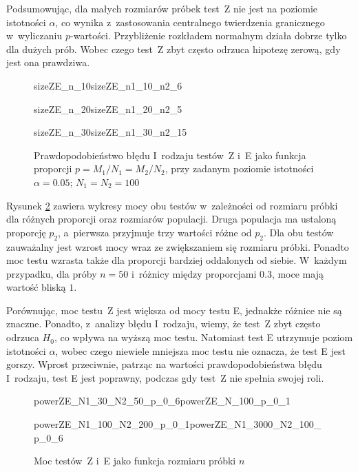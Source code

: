 Podsumowując, dla małych rozmiarów próbek test~Z nie jest na poziomie istotności $\alpha$, co wynika z~zastosowania centralnego twierdzenia granicznego w~wyliczaniu $p$-wartości. Przybliżenie rozkładem normalnym działa dobrze tylko dla dużych prób. Wobec czego test~Z zbyt często odrzuca hipotezę zerową, gdy jest ona prawdziwa. 

\begin{figure}[!h]
	\begin{subdiagrams}{sizeZE_n_10}{sizeZE_n1_10_n2_6}
	\end{subdiagrams}
	
	\begin{subdiagrams}{sizeZE_n_20}{sizeZE_n1_20_n2_5}
	\end{subdiagrams}
	
	\begin{subdiagrams}{sizeZE_n_30}{sizeZE_n1_30_n2_15}
	\end{subdiagrams}
	\caption{Prawdopodobieństwo błędu I~rodzaju testów~Z i~E jako funkcja proporcji $p=M_1/N_1=M_2/N_2$, przy zadanym poziomie istotności $\alpha=0.05$; $N_1=N_2=100$}
	\label{sizeZE_p}
\end{figure}

Rysunek \ref{powerZE_n} zawiera wykresy mocy obu testów w~zależności od rozmiaru próbki dla różnych proporcji oraz rozmiarów populacji. Druga populacja ma ustaloną proporcję $p_2$, a~pierwsza przyjmuje trzy wartości różne od $p_2$. Dla obu testów zauważalny jest wzrost mocy wraz ze zwiększaniem się rozmiaru próbki. Ponadto moc testu wzrasta także dla proporcji bardziej oddalonych od siebie. W~każdym przypadku, dla próby $n=50$ i~różnicy między proporcjami $0.3$, moce mają wartość bliską $1$. 

Porównując, moc testu~Z jest większa od mocy testu E, jednakże różnice nie są znaczne. Ponadto, z~analizy błędu I~rodzaju, wiemy, że test~Z zbyt często odrzuca $H_0$, co wpływa na wyższą moc testu. Natomiast test E utrzymuje poziom istotności $\alpha$, wobec czego niewiele mniejsza moc testu nie oznacza, że test E jest gorszy. Wprost przeciwnie, patrząc na wartości prawdopodobieństwa błędu I~rodzaju, test E jest poprawny, podczas gdy test~Z nie spełnia swojej roli.

\begin{figure}[!h]
	\begin{subdiagrams}{powerZE_N1_30_N2_50_p_0_6}{powerZE_N_100_p_0_1}
	\end{subdiagrams}
	
	\begin{subdiagrams}{powerZE_N1_100_N2_200_p_0_1}{powerZE_N1_3000_N2_100_p_0_6}
	\end{subdiagrams}
	
	\caption{Moc testów~Z i~E jako funkcja rozmiaru próbki $n$}
	\label{powerZE_n}
\end{figure}

